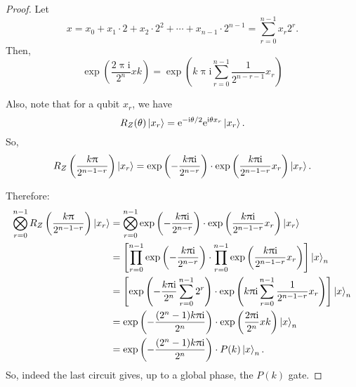 \documentclass[12pt]{amsart}
\theoremstyle{plain}
\theoremstyle{definition}
\theoremstyle{remarks}
\newcommand{\me}{\mathrm{e}}
\newcommand{\mi}{\mathrm{i}}
\newcommand{\mpi}{\uppi}
\begin{document}
\begin{proof}
  Let
  \[
    x = x_0 + x_1 \cdot 2 + x_2 \cdot 2^2 + \cdots + x_{n-1} \cdot 2^{n-1} = \sum_{r=0}^{n-1} x_r 2^r.
  \]
  Then,
  \begin{equation}\label{eq:exp1}
    \exp\left(\frac{2 \mpi \mi}{2^n} xk \right) = \exp\left(k \mpi \mi \sum_{r=0}^{n-1} \frac{1}{2^{n-r-1}} x_r\right)
  \end{equation}

  Also, note that for a qubit $x_r$, we have
  \[
    R_Z(\theta) \ket{x_r} = \me^{-\mi \theta/2} \me^{\mi \theta x_r} \ket{x_r}.
  \]
  So,
  \[
    R_Z\left(\frac{k \mpi}{2^{n-1-r}}\right) \ket{x_r} = \exp\left(-\frac{k \mpi \mi}{2^{n-r}}\right) \cdot \exp\left(\frac{k \mpi \mi}{2^{n-1-r}} x_r\right) \ket{x_r}.
  \]

  Therefore:
  \begin{align*}
    \bigotimes_{r=0}^{n-1}R_Z\left(\frac{k \mpi} {2^{n-1-r}}\right) \ket{x_r}
    &= \bigotimes_{r=0}^{n-1} \exp\left(-\frac{k \mpi \mi}{2^{n-r}}\right) \cdot \exp\left(\frac{k \mpi \mi}{2^{n-1-r}} x_r\right) \ket{x_r} \\
    &= \left[\prod_{r=0}^{n-1} \exp\left(-\frac{k \mpi \mi}{2^{n-r}}\right) \cdot \prod_{r=0}^{n-1}  \exp\left(\frac{k \mpi \mi}{2^{n-1-r}} x_r\right)\right] \ket{x}_n \\
    &= \left[\exp\left(-\frac{k \mpi \mi}{2^n} \sum_{r=0}^{n-1} 2^r\right) \cdot \exp\left(k \mpi \mi \sum_{r=0}^{n-1}\frac{1}{2^{n-1-r}} x_r\right)\right] \ket{x}_n \\
    &= \exp\left(-\frac{(2^n-1) k \mpi \mi}{2^n}\right) \cdot \exp\left(\frac{2 \mpi \mi}{2^n} xk \right) \ket{x}_n \\
    &= \exp\left(-\frac{(2^n-1) k \mpi \mi}{2^n}\right) \cdot P(k) \ket{x}_n.
  \end{align*}
  So, indeed the last circuit gives, up to a global phase, the $P(k)$ gate.
\end{proof}

\printindex[not]
\printindex
\end{document}
